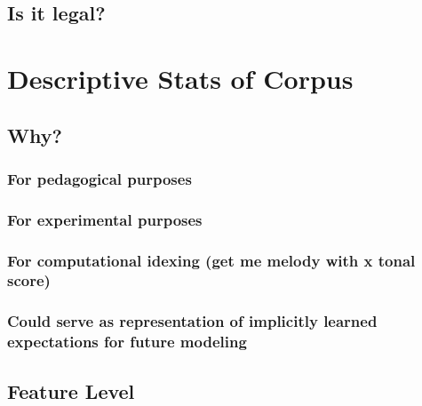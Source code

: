 \documentclass[]{book}
\begin{document}
\hypertarget{is-it-legal}{%
\subsection{Is it legal?}\label{is-it-legal}}

\hypertarget{descriptive-stats-of-corpus}{%
\section{Descriptive Stats of Corpus}\label{descriptive-stats-of-corpus}}

\hypertarget{why}{%
\subsection{Why?}\label{why}}

\hypertarget{for-pedagogical-purposes}{%
\subsubsection{For pedagogical purposes}\label{for-pedagogical-purposes}}

\hypertarget{for-experimental-purposes}{%
\subsubsection{For experimental purposes}\label{for-experimental-purposes}}

\hypertarget{for-computational-idexing-get-me-melody-with-x-tonal-score}{%
\subsubsection{For computational idexing (get me melody with x tonal score)}\label{for-computational-idexing-get-me-melody-with-x-tonal-score}}

\hypertarget{could-serve-as-representation-of-implicitly-learned-expectations-for-future-modeling}{%
\subsubsection{Could serve as representation of implicitly learned expectations for future modeling}\label{could-serve-as-representation-of-implicitly-learned-expectations-for-future-modeling}}

\hypertarget{feature-level}{%
\subsection{Feature Level}\label{feature-level}}
\end{document}
